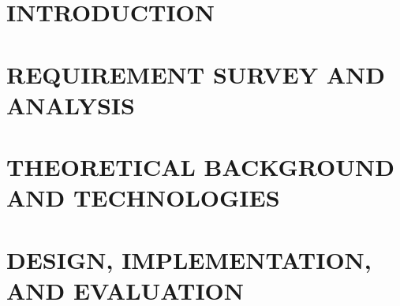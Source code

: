 \documentclass[a4paper,13pt,3p,twoside]{report}
\makeatletter
\theoremstyle{definition}
\DeclareRobustCommand{\_}{\textunderscore\penalty\z@\hspace{0pt}}
\makeatother
\begin{document}
\renewcommand{\listtablename}{LIST OF TABLES}
{\let\oldnumberline\numberline
\renewcommand{\numberline}{Bảng~\oldnumberline}
\listoftables}

\glsaddall 
\renewcommand*{\acronymname}{LIST OF ABBREVIATIONS}
\renewcommand*{\entryname}{Abriviation}
\renewcommand*{\descriptionname}{Full Expression}
\printnoidxglossaries

% 

% 


\newpage

\pagestyle{fancy}
\fancyhf{}
\fancyhead[RE, LO]{\leftmark}
\fancyfoot[RE, LO]{\thepage}

\chapter{INTRODUCTION}
\label{chapter:Introduction}

\newpage
\chapter{REQUIREMENT SURVEY AND ANALYSIS}
\label{chapter:Related_works}



\newpage
\chapter{THEORETICAL BACKGROUND AND TECHNOLOGIES}
\label{chapter:Methodology}


\newpage
\chapter{DESIGN, IMPLEMENTATION, AND EVALUATION}
\label{chapter:Experiment}

\end{document}
